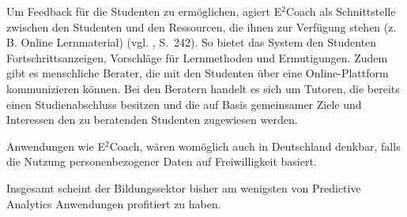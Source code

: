 Um Feedback für die Studenten zu ermöglichen, agiert E$^2$Coach als Schnittstelle zwischen
den Studenten und den Ressourcen, die ihnen zur Verfügung stehen (z. B. Online Lernmaterial) (vgl. \cite{Mattingly}, S.~242).
So bietet das System den Studenten Fortschrittsanzeigen, Vorschläge für Lernmethoden und Ermutigungen.
Zudem gibt es menschliche Berater, die mit den Studenten über eine Online-Plattform kommunizieren können.
Bei den Beratern handelt es sich um Tutoren, die bereits einen Studienabschluss besitzen und die auf Basis
gemeinsamer Ziele und Interessen den zu beratenden Studenten zugewiesen werden.

Anwendungen wie E$^2$Coach, wären womöglich auch in Deutschland denkbar, falls die Nutzung personenbezogener
Daten auf Freiwilligkeit basiert.

Insgesamt scheint der Bildungssektor bisher am wenigsten von
Predictive Analytics Anwendungen profitiert zu haben.

